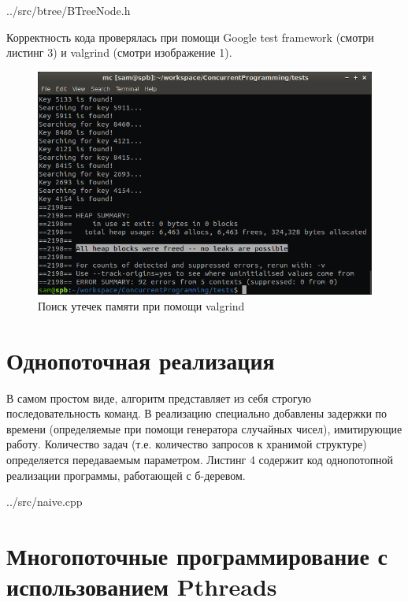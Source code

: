 \documentclass[a4paper, 12pt]{report}		%
\begin{document}

{../src/btree/BTreeNode.h}

Корректность кода проверялась при помощи Google test framework (смотри листинг 3) и valgrind (смотри изображение 1).



\begin{figure}[h!]
\centering
\includegraphics[scale=0.68]{res/valgrind}
\caption{Поиск утечек памяти при помощи valgrind}
\end{figure}


\chapter*{Однопоточная реализация}

В самом простом виде, алгоритм представляет из себя строгую последовательность команд. В реализацию специально добавлены задержки по времени (определяемые при помощи генератора случайных чисел), имитирующие работу. Количество задач (т.е. количество запросов к хранимой структуре) определяется передаваемым параметром. Листинг 4 содержит код однопотопной реализации программы, работающей с б-деревом.


{../src/naive.cpp}



\chapter*{Многопоточные программирование с использованием Pthreads}
\end{document}
